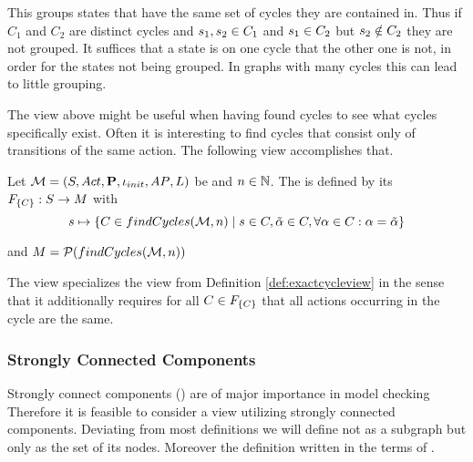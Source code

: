 \documentclass[preview]{standalone}
\begin{document}
This \viewN groups states that have the same set of cycles they are contained in. Thus if $C_1$ and $C_2$ are distinct cycles and ${s}_1, {s}_2 \in {C}_1$ and ${s}_1 \in {C}_2$ but ${s}_2 \notin {C}_2$ they are not grouped. It suffices that a state is on one cycle that the other one is not, in order for the states not being grouped. In graphs with many cycles this can lead to little grouping.



The view above might be useful when having found cycles to see what cycles specifically exist. Often it is interesting to find cycles that consist only of transitions of the same action. The following view accomplishes that.

\begin{definition}
	Let ${{{\mathcal{M}}}} = {{({S}, {Act}, {\textbf{P}}, {\iota_{init}}, {AP}, {L})}}$ be \chosengraphtypeN and $n \in {\mathbb{N}}$. The \viewN \viewexactcycle is defined by its \grpfctN ${{F_{\{{C}\}}}} : {S} \to {\ensuremath{{M}}}$ with
	\[
	{s} \mapsto \{{C} \in {findCycles}({{{\mathcal{M}}}}, n) \mid {s} \in {C}, \tilde{{\alpha}} \in {C}, \forall {\alpha} \in {C} : {\alpha} = \tilde{{\alpha}} \}
	\]
	
	and ${{M}} = {\mathcal{P}({findCycles}({{{\mathcal{M}}}}, n))}$
\end{definition}

The view specializes the view from Definition \ref{def:exactcycleview} in the sense that it additionally requires for all ${C} \in {\ensuremath{{F_{\{{C}\}}}}}$ that all actions occurring in the cycle are the same. 



\subsubsection{Strongly Connected Components}
Strongly connect components (\sccN) are of major importance in model checking 
Therefore it is feasible to consider a view utilizing strongly connected components. Deviating from most definitions we will define \sccN not as a subgraph but only as the set of its nodes. Moreover the definition written in the terms of \chosengraphtypeN.
\end{document}
